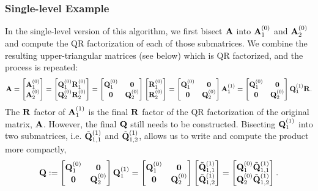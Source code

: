 \subsubsection{Single-level Example}
\label{Qdetails}
In the single-level version of this algorithm, we first bisect $\mathbf{A}$  into $\mathbf{A}_1^{(0)}$ and $\mathbf{A}_2^{(0)}$ and compute the QR factorization of each of those submatrices.
We combine the resulting upper-triangular matrices (see below)
which is QR factorized, and the process is repeated:
\[
\mathbf{A} = \begin{bmatrix}
\mathbf{A}_1^{(0)}\\
\mathbf{A}_2^{(0)}
\end{bmatrix} = \begin{bmatrix}
\mathbf{Q}_1^{(0)}\mathbf{R}_1^{(0)}\\
\mathbf{Q}_2^{(0)}\mathbf{R}_2^{(0)}
\end{bmatrix} = \begin{bmatrix}
\mathbf{Q}_1^{(0)} & \mathbf{0}\\
\mathbf{0} & \mathbf{Q}_2^{(0)}
\end{bmatrix} \begin{bmatrix}
\mathbf{R}_1^{(0)} \\
\mathbf{R}_2^{(0)}
\end{bmatrix} =\begin{bmatrix}
\mathbf{Q}_1^{(0)} & \mathbf{0}\\
\mathbf{0} & \mathbf{Q}_2^{(0)}
\end{bmatrix} \mathbf{A}_1^{(1)} =\begin{bmatrix}
\mathbf{Q}_1^{(0)} & \mathbf{0}\\
\mathbf{0} & \mathbf{Q}_2^{(0)}
\end{bmatrix} \mathbf{Q}_1^{(1)}\mathbf{R}.
\] 
The $\mathbf{R}$ factor of $\mathbf{A}_1^{(1)}$ is the final $\mathbf{R}$ factor of the QR factorization of the original matrix, $\mathbf{A}$. 
However, the final $\mathbf{Q}$ still needs to be constructed.
Bisecting  $\mathbf{Q}_1^{(1)}$ into two submatrices, i.e. $\tilde{\mathbf{Q}}_{1,1}^{(1)}$ and $\tilde{\mathbf{Q}}_{1,2}^{(1)}$, allows us to write and compute the product more compactly,  \[
\mathbf{Q}:=\begin{bmatrix}
\mathbf{Q}_1^{(0)} & \mathbf{0}\\
\mathbf{0} & \mathbf{Q}_2^{(0)}
\end{bmatrix} \mathbf{Q}_1^{(1)} =    \begin{bmatrix}
\mathbf{Q}_1^{(0)} & \mathbf{0}\\
\mathbf{0} & \mathbf{Q}_2^{(0)}
\end{bmatrix} \begin{bmatrix}
\tilde{\mathbf{Q}}_{1,1}^{(1)}\\
\tilde{\mathbf{Q}}_{1,2}^{(1)}
\end{bmatrix}= \begin{bmatrix}
\mathbf{Q}_1^{(0)}\tilde{\mathbf{Q}}_{1,1}^{(1)} \\ 
\mathbf{Q}_2^{(0)}\tilde{\mathbf{Q}}_{1,2}^{(1)}
\end{bmatrix}. \]
